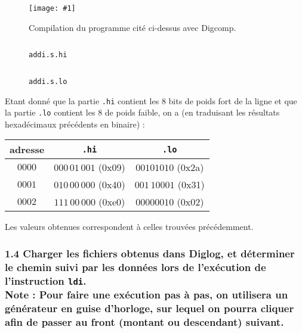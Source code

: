 \documentclass[twoside, 12pt, a4paper]{article}
\newcommand{\cf}[3]{
    \begin{figure}[!h]
        \centering
        \texttt{[image: \#1]}
    \caption{#3}\label{Fig:#1}
    \end{figure}
}
\newcommand{\hcf}[2]{\cf{#1}{.75}{#2}}
\begin{document}
    \hcf{compil_addi.png}{Compilation du programme cité ci-dessus avec Digcomp.}

\begin{figure}[!h]
   \begin{minipage}{0.48\textwidth}
     \centering
     \inputminted[]{text}{../asm/ex1/addi.s.hi}
     \caption{\texttt{addi.s.hi}}
     \label{fig:addi.s.hi}
   \end{minipage}\hfill
   \begin{minipage}{0.48\textwidth}
     \centering    
     \inputminted[]{text}{../asm/ex1/addi.s.lo}
     \caption{\texttt{addi.s.lo}}
     \label{fig:addi.s.lo}
   \end{minipage}
\end{figure}

    Etant donné que la partie \texttt{.hi} contient les 8 bits de poids fort de la ligne et que la partie \texttt{.lo} contient les 8 de poids faible, on a (en traduisant les résultats hexadécimaux précédents en binaire) :
    \begin{center}
        \begin{tabular}{|c|c|c|}
            \hline
            adresse & \texttt{.hi} & \texttt{.lo} \\
            \hline
             $0000$ & $000\,01\,001$ (0x09) & $00101010$ (0x2a)\\
             $0001$ & $010\,00\,000$ (0x40) & $001\,10001$ (0x31)\\
             $0002$ & $111\,00\,000$ (0xe0) & $00000010$ (0x02)\\ 
             \hline
        \end{tabular}
    \end{center}

    Les valeurs obtenues correspondent à celles trouvées précédemment.

        \subsubsection*{\textbf{1.4} Charger les fichiers obtenus dans Diglog, et déterminer le chemin suivi par les données lors de l’exécution de l’instruction \texttt{ldi}. \\
        \textbf{Note :} Pour faire une exécution pas à pas, on utilisera un générateur en guise d'horloge, sur lequel on pourra cliquer afin de passer au front (montant ou descendant) suivant.}

\end{document}
